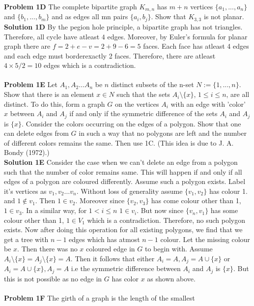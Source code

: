 \documentclass{book}
\begin{document}
\textbf{Problem 1D} The complete bipartite graph $K_{m,n}$ has $m+n$ vertices $\{a_1,...,a_n\}$ and $\{b_1,...,b_m\}$ and as edges all mn pairs $\{a_i, b_j\}$.
Show that $K_{3,3 }$ is not planar.\\
\textbf{Solution 1D} By the pegion hole principle, a bipartite graph has not triangles. Therefore, all cycle have atleast $4$ edges. Moreover, by Euler's formula for planar graph there are $f=2+e-v=2+9-6=5$ faces. Each face has atleast 4 edges and each edge must borderexactly 2 faces. Therefore, there are atleast $4\times 5/2=10$ edges which is a contradiction.\\\\
\textbf{Problem 1E}  Let $A_1,A_2\hdots A_n$ be $n$ distinct subsets of the n-set
$N := \{1,...,n\}$. Show that there is an element $x \in N$ such that
the sets $A_i\setminus\{x\}$, $1 \leq i \leq n$, are all distinct. To do this, form a graph
$G$ on the vertices $A_i$ with an edge with 'color' $x$ between $A_i$ and $A_j$
if and only if the symmetric difference of the sets $A_i$ and $A_j$ is $\{x\}$.
Consider the colors occurring on the edges of a polygon. Show that
one can delete edges from $G$ in such a way that no polygons are
left and the number of different colors remains the same. Then use
1C. (This idea is due to J. A. Bondy (1972).)\\
\textbf{Solution 1E} Consider the case when we can't delete an edge from a polygon such that the number of color remains same. This will happen if and only if all edges of a polygon are coloured differently. Assume such a polygon exists. Label it's vertices as $v_1,v_2\hdots v_n$. Without loss of generality assume $\{v_1,v_2\}$ has colour 1. and $1\notin v_1$. Then $1\in v_2$. Moreover since $\{v_2,v_3\}$ has come colour other than 1, $1\in v_3$. In a similar way, for $1<i\leq n$ $1\in v_i$. But now since $\{v_n,v_1\}$ has some colour other than 1, $1\in V_1$ which is a contradiction. Therefore, no such polygon exists. Now after doing this operation for all existing polygons, we find that we get a tree with $n-1$ edges which has atmost $n-1$ colour. Let the missing colour be $x$. Then there was no $x$ coloured edge in $G$ to begin with. Assume $A_i\setminus\{x\}=A_j\setminus\{x\}=A$. Then it follows that either $A_i=A,A_j=A\cup\{x\}$ or $A_i=A\cup\{x\},A_j=A$ i.e the symmetric difference between $A_i$ and $A_j$ is $\{x\}$. But this is not possible as no edge in $G$ has color $x$ as shown above. \\\\
\textbf{Problem 1F} The girth of a graph is the length of the smallest
\end{document}
